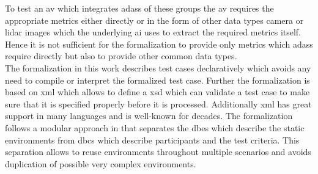 To test an \gls{av} which integrates \glspl{adas} of these groups the \gls{av} requires the appropriate metrics either directly or in the form of other data types \eg{} camera or \gls{lidar} images which the underlying \gls{ai} uses to extract the required metrics itself.
Hence it is not sufficient for the formalization to provide only metrics which \glspl{adas} require directly but also to provide other common data types.\\
The formalization in this work describes test cases declaratively which avoids any need to compile or interpret the formalized test case.
Further the formalization is based on \gls{xml} which allows to define a \gls{xsd} which can validate a test case to make sure that it is specified properly before it is processed.
Additionally \gls{xml} has great support in many languages and is well-known for decades.
The formalization follows a modular approach in that separates the \glspl{dbe} which describe the static environments from \glspl{dbc} which describe participants and the test criteria.
This separation allows to reuse environments throughout multiple scenarios and avoids duplication of possible very complex environments.
